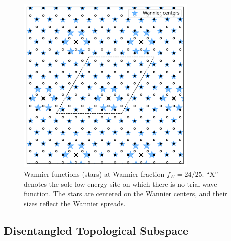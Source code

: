 \documentclass[galley,aps,pra,10pt,amsmath,amssymb,
    superscriptaddress,nofootinbib,longbibliography]{revtex4-2}
\begin{document}
\begin{figure}[t]
\begin{center}
\includegraphics[width=3.4in]{fig6.png}
\end{center}
\vspace{-5mm}
\caption{Wannier functions (stars) at Wannier fraction $f_W = 24/25$. ``X'' denotes the sole low-energy site on which there is no trial wave function. The stars are centered on the Wannier centers, and their sizes reflect the Wannier spreads.}
\label{FIG6}
\end{figure}


\subsection{Disentangled Topological Subspace}
\end{document}
